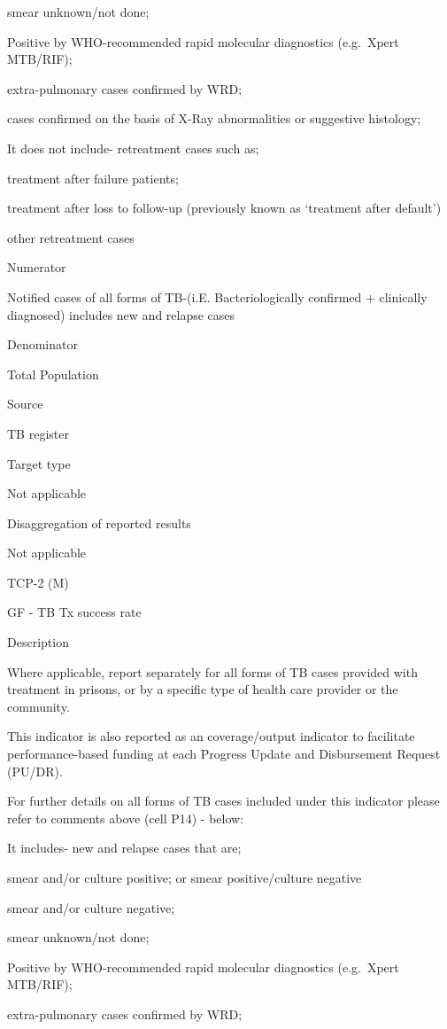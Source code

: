 \documentclass[]{book}
\begin{document}
smear unknown/not done;

Positive by WHO-recommended rapid molecular diagnostics (e.g.~Xpert MTB/RIF);

extra-pulmonary cases confirmed by WRD;

cases confirmed on the basis of X-Ray abnormalities or suggestive histology;

It does not include- retreatment cases such as;

treatment after failure patients;

treatment after loss to follow-up (previously known as `treatment after default')

other retreatment cases

Numerator

Notified cases of all forms of TB-(i.E. Bacteriologically confirmed + clinically diagnosed) includes new and relapse cases

Denominator

Total Population

Source

TB register

Target type

Not applicable

Disaggregation of reported results

Not applicable

TCP-2 (M)

GF - TB Tx success rate

Description

Where applicable, report separately for all forms of TB cases provided
with treatment in prisons, or by a specific type of health care provider or the community.

This indicator is also reported as an coverage/output indicator to facilitate performance-based funding at each Progress Update and Disbursement Request (PU/DR).

For further details on all forms of TB cases included under this indicator please refer to comments above (cell P14) - below:

It includes- new and relapse cases that are;

smear and/or culture positive; or smear positive/culture negative

smear and/or culture negative;

smear unknown/not done;

Positive by WHO-recommended rapid molecular diagnostics (e.g.~Xpert MTB/RIF);

extra-pulmonary cases confirmed by WRD;
\end{document}

